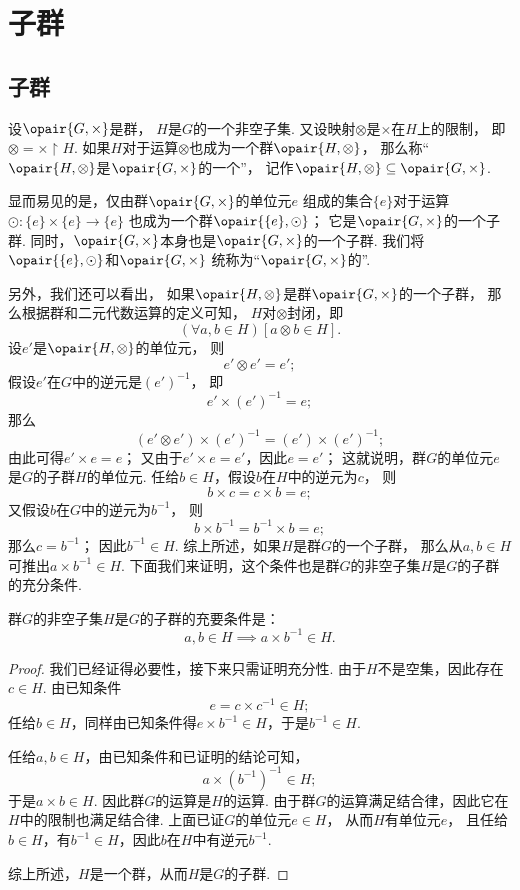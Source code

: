 \section{子群}
\subsection{子群}
\begin{definition}
设\(\opair{G,\times}\)是群，
\(H\)是\(G\)的一个非空子集.
又设映射\(\otimes\)是\(\times\)在\(H\)上的限制，
即\(\otimes = \times \upharpoonright H\).
如果\(H\)对于运算\(\otimes\)也成为一个群\(\opair{H,\otimes}\)，
那么称“\(\opair{H,\otimes}\)是\(\opair{G,\times}\)的一个”，
记作\(\opair{H,\otimes} \subseteq \opair{G,\times}\).
\end{definition}

显而易见的是，仅由群\(\opair{G,\times}\)的单位元\(e\)%
组成的集合\(\{e\}\)对于运算\(\odot\colon \{e\}\times\{e\}\to\{e\}\)%
也成为一个群\(\opair{\{e\},\odot}\)；
它是\(\opair{G,\times}\)的一个子群.
同时，\(\opair{G,\times}\)本身也是\(\opair{G,\times}\)的一个子群.
我们将\(\opair{\{e\},\odot}\)和\(\opair{G,\times}\)%
统称为“\(\opair{G,\times}\)的”.

另外，我们还可以看出，
如果\(\opair{H,\otimes}\)是群\(\opair{G,\times}\)的一个子群，
那么根据群和二元代数运算的定义可知，
\(H\)对\(\otimes\)封闭，即
\[
	(\forall a,b \in H)[a \otimes b \in H].
\]
设\(e'\)是\(\opair{H,\otimes}\)的单位元，
则\[
	e' \otimes e' = e';
\]
假设\(e'\)在\(G\)中的逆元是\((e')^{-1}\)，
即\[
	e' \times (e')^{-1} = e;
\]
那么\[
	(e' \otimes e') \times (e')^{-1} = (e') \times (e')^{-1};
\]
由此可得\(e' \times e = e\)；
又由于\(e' \times e = e'\)，因此\(e = e'\)；
这就说明，群\(G\)的单位元\(e\)是\(G\)的子群\(H\)的单位元.
任给\(b \in H\)，假设\(b\)在\(H\)中的逆元为\(c\)，
则\[
	b \times c = c \times b = e;
\]
又假设\(b\)在\(G\)中的逆元为\(b^{-1}\)，
则\[
	b \times b^{-1} = b^{-1} \times b = e;
\]
那么\(c = b^{-1}\)；
因此\(b^{-1} \in H\).
综上所述，如果\(H\)是群\(G\)的一个子群，
那么从\(a,b \in H\)可推出\(a \times b^{-1} \in H\).
下面我们来证明，这个条件也是群\(G\)的非空子集\(H\)是\(G\)的子群的充分条件.
\begin{theorem}
群\(G\)的非空子集\(H\)是\(G\)的子群的充要条件是：\[
	a,b \in H \implies a \times b^{-1} \in H.
\]
\begin{proof}
我们已经证得必要性，接下来只需证明充分性.
由于\(H\)不是空集，因此存在\(c \in H\).
由已知条件\[
	e = c \times c^{-1} \in H;
\]
任给\(b \in H\)，同样由已知条件得\(e \times b^{-1} \in H\)，于是\(b^{-1} \in H\).

任给\(a,b \in H\)，由已知条件和已证明的结论可知，\[
	a \times (b^{-1})^{-1} \in H;
\]于是\(a \times b \in H\).
因此群\(G\)的运算是\(H\)的运算.
由于群\(G\)的运算满足结合律，因此它在\(H\)中的限制也满足结合律.
上面已证\(G\)的单位元\(e \in H\)，
从而\(H\)有单位元\(e\)，
且任给\(b \in H\)，有\(b^{-1} \in H\)，因此\(b\)在\(H\)中有逆元\(b^{-1}\).

综上所述，\(H\)是一个群，从而\(H\)是\(G\)的子群.
\end{proof}
\end{theorem}

